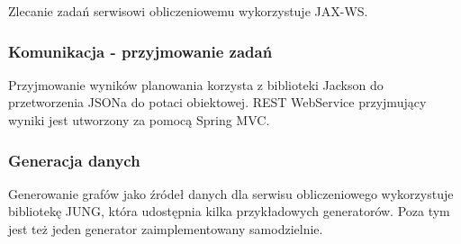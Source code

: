 Zlecanie zadań serwisowi obliczeniowemu wykorzystuje JAX-WS.

\subsubsection{Komunikacja - przyjmowanie zadań}

Przyjmowanie wyników planowania korzysta z biblioteki Jackson do przetworzenia JSONa do potaci obiektowej.
REST WebService przyjmujący wyniki jest utworzony za pomocą Spring MVC.

\subsubsection{Generacja danych}

Generowanie grafów jako źródeł danych dla serwisu obliczeniowego wykorzystuje bibliotekę JUNG, która udostępnia kilka przykładowych generatorów.
Poza tym jest też jeden generator zaimplementowany samodzielnie.
